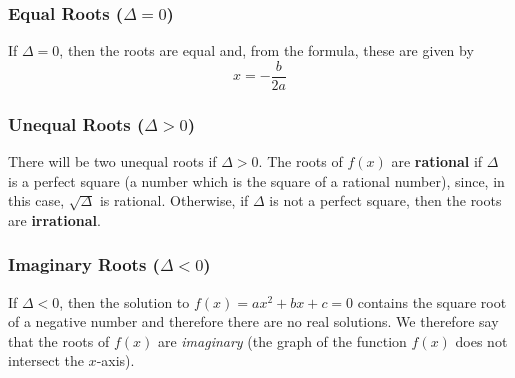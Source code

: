 {\subsubsection*{Equal Roots ($\Delta = 0$)}
If $\Delta = 0$, then the roots are equal and, from the formula, these
are given by
\begin{equation}
x = -\frac{b}{2a}
\end{equation}

\subsubsection*{Unequal Roots ($\Delta > 0$)}
There will be two unequal roots if $\Delta > 0$. The roots of $f(x)$ are \textbf{rational} if $\Delta$ is a perfect square (a number which is the square of a rational number), since, in this case, $\sqrt{\Delta}$ is rational. Otherwise, if $\Delta$ is not a perfect square, then the roots are \textbf{irrational}.

\subsubsection*{Imaginary Roots ($\Delta < 0$)}
If $\Delta < 0$, then the solution to $f(x) = ax^{2} + bx + c = 0$ contains the square root of a negative number and therefore there are no real solutions. We therefore say that the roots of $f(x)$ are \emph{imaginary} (the graph of the function $f(x)$ does not intersect the $x$-axis).
}
